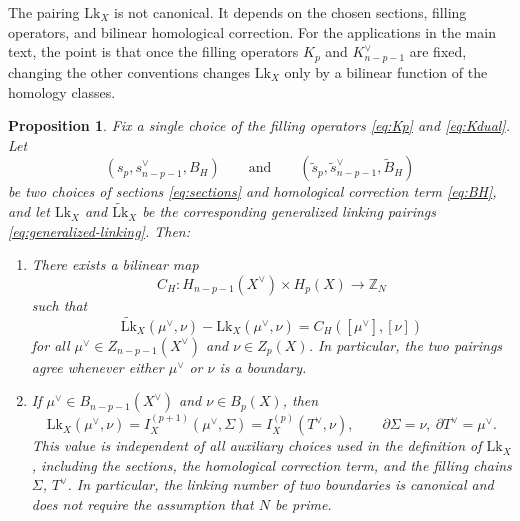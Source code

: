 \documentclass[dvipsnames,a4paper]{article}
\numberwithin{equation}{section}
\newtheorem{prop}[theorem]{Proposition}
\theoremstyle{definition}
\theoremstyle{remark}
\newcommand{\Lk}{\mathrm{Lk}}
\begin{document}
The pairing \(\Lk_X\) is not canonical. It depends on the chosen sections,
filling operators, and bilinear homological correction. For the applications in the main
text, the point is that once the filling operators \(K_p\) and \(K^\vee_{n-p-1}\) are
fixed, changing the other conventions changes \(\Lk_X\) only by a bilinear
function of the homology classes.

\begin{prop}
	\label{prop:choice-dependence}
	Fix a single choice of the filling operators \eqref{eq:Kp} and \eqref{eq:Kdual}. Let
	\begin{equation}
		(s_p,s^\vee_{n-p-1},B_H)
		\qquad\text{and}\qquad
		(\widetilde s_p,\widetilde s^\vee_{n-p-1},\widetilde B_H)
	\end{equation}
	be two choices of sections \eqref{eq:sections} and homological correction term
	\eqref{eq:BH}, and let \(\Lk_X\) and \(\widetilde{\Lk}_X\) be the corresponding
	generalized linking pairings \eqref{eq:generalized-linking}. Then:
	\begin{enumerate}[label=(\roman*)]
		\item\label{prop:choice-dependence-item1}
		There exists a bilinear map
		\begin{equation}
			C_H:H_{n-p-1}(X^\vee)\times H_p(X)\to \mathbb Z_N
			\label{eq:DeltaH}
		\end{equation}
		such that
		\begin{equation}
			\widetilde{\Lk}_X(\mu^\vee,\nu)-\Lk_X(\mu^\vee,\nu)
			=
			C_H\left([\mu^\vee],[\nu]\right)
			\label{eq:choice-dependence}
		\end{equation}
		for all
		\(\mu^\vee\in Z_{n-p-1}(X^\vee)\) and \(\nu\in Z_p(X)\). In particular, the two
		pairings agree whenever either \(\mu^\vee\) or \(\nu\) is a boundary.
		
		\item\label{propItem:bdryLink}
		If \(\mu^\vee\in B_{n-p-1}(X^\vee)\) and \(\nu\in B_p(X)\), then
		\begin{equation}
			\Lk_X(\mu^\vee,\nu)
			=
			I_X^{(p+1)}\left(\mu^\vee,\Sigma\right)
			=
			I_X^{(p)}\left(T^\vee,\nu\right),
			\qquad
			\partial\Sigma=\nu,\ \partial T^\vee=\mu^\vee.
			\label{eq:boundary-linking-canonical-merged}
		\end{equation}
		This value is independent of all auxiliary choices used in the definition of
		\(\Lk_X\), including the sections, the homological correction term, and the
		filling chains \(\Sigma\), \(T^\vee\). In particular, the linking number of two
		boundaries is canonical and does not require the assumption that \(N\) be
		prime.
	\end{enumerate}
\end{prop}
\end{document}
